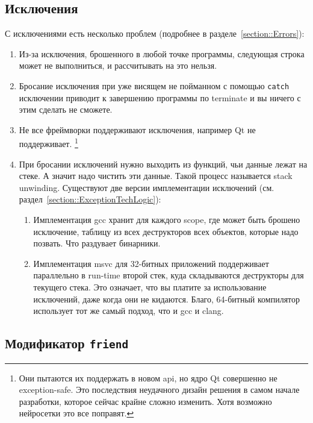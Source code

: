 \subsection{Исключения}

С исключениями есть несколько проблем (подробнее в разделе~\ref{section::Errors}):
\begin{enumerate}
\item Из-за исключения, брошенного в любой точке программы, следующая строка может не выполниться, и рассчитывать на это нельзя.

\item Бросание исключения при уже висящем не пойманном с помощью \verb"catch" исключении приводит к завершению программы по terminate и вы ничего с этим сделать не сможете.

\item Не все фреймворки поддерживают исключения, например Qt не поддерживает.%
\footnote{Они пытаются их поддержать в новом api, но ядро Qt совершенно не exception-safe.
Это последствия неудачного дизайн решения в самом начале разработки, которое сейчас крайне сложно изменить.
Хотя возможно нейросетки это все поправят.}

\item При бросании исключений нужно выходить из функций, чьи данные лежат на стеке.
А значит надо чистить эти данные.
Такой процесс называется stack unwinding.
Существуют две версии имплементации исключений (см. раздел~\ref{section::ExceptionTechLogic}):
\begin{enumerate}
\item Имплементация gcc хранит для каждого scope, где может быть брошено исключение, таблицу из всех деструкторов всех объектов, которые надо позвать.
Что раздувает бинарники.

\item Имплементация msvc для 32-битных приложений поддерживает параллельно в run-time второй стек, куда складываются деструкторы для текущего стека.
Это означает, что вы платите за использование исключений, даже когда они не кидаются.
Благо, 64-битный компилятор использует тот же самый подход, что и gcc и clang.
\end{enumerate}
\end{enumerate}

\subsection{Модификатор \texttt{friend}}

